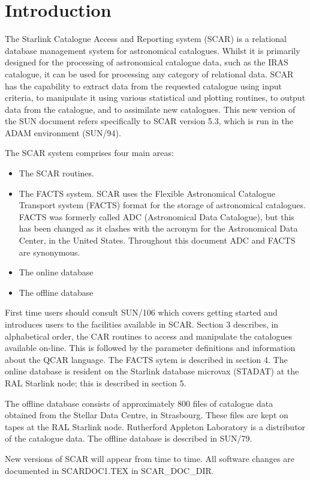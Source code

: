 \section {Introduction}

The Starlink Catalogue Access and Reporting system (SCAR) is a relational
database management system for astronomical catalogues.
Whilst it is primarily designed for the processing of astronomical catalogue
data, such as the IRAS catalogue, it can be used for processing any category of
relational data.
SCAR has the capability to extract data from the requested catalogue using input
criteria, to manipulate it using various statistical and plotting routines,
to output data from the catalogue, and to assimilate new catalogues.
This new version of the SUN document refers specifically to SCAR version 5.3,
which is run in the ADAM environment (SUN/94).

The SCAR system comprises four main areas:
\begin{itemize}
\item The SCAR routines.
\item The FACTS system. SCAR uses the Flexible Astronomical Catalogue Transport
system (FACTS) format for the storage of astronomical catalogues.
FACTS was formerly called ADC (Astronomical Data Catalogue), but this has been
changed as it clashes with the acronym for the Astronomical Data Center, in
the United States.
Throughout this document ADC and FACTS are synonymous.
\item The online database
\item The offline database
\end{itemize}
First time users should consult SUN/106 which covers getting started and
introduces users to the facilities available in SCAR.
Section 3 describes, in alphabetical order, the CAR routines to access and
manipulate the catalogues available on-line. This is followed by the parameter
definitions
and information about the QCAR language.
The FACTS sytem is described in section 4.
The online database is resident on the Starlink database microvax (STADAT)
at the RAL Starlink node; this is described in section 5.

The offline database consists of approximately 800 files of catalogue data
obtained from the Stellar Data Centre, in Strasbourg.
These files are kept on tapes at the RAL Starlink node.
Rutherford Appleton Laboratory is a distributor of the catalogue data.
The offline database is described in SUN/79.

New versions of SCAR will appear from time to time.
All software changes are documented in SCARDOC1.TEX in SCAR\_DOC\_DIR.

